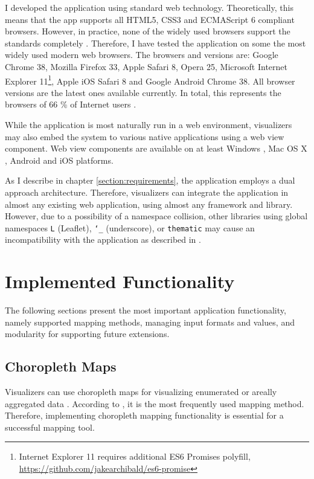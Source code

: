 I developed the application using standard web technology. Theoretically, this means that the app supports all HTML5, CSS3 and ECMAScript 6 compliant browsers. However, in practice, none of the widely used browsers support the standards completely \citep{manian_html5_2011}. Therefore, I have tested the application on some the most widely used modern web browsers. The browsers and versions are: Google Chrome 38, Mozilla Firefox 33, Apple Safari 8, Opera 25, Microsoft Internet Explorer 11\footnote{Internet Explorer 11 requires additional ES6 Promises polyfill, \url{https://github.com/jakearchibald/es6-promise}}, Apple iOS Safari 8 and Google Android Chrome 38. All browser versions are the latest ones available currently. In total, this represents the browsers of 66 \% of Internet users \citep{statcounter_globalstats_2014}.

While the application is most naturally run in a web environment, visualizers may also embed the system to various native applications using a web view component. Web view components are available on at least Windows \citep{small_ten_2012}, Mac OS X \citep{hunter_why_2014}, Android \citep{google_building_2014} and iOS \citep{apple_uiwebview_2014} platforms.

As I describe in chapter \ref{section:requirements}, the application employs a dual approach architecture. Therefore, visualizers can integrate the application in almost any existing web application, using almost any framework and library. However, due to a possibility of a namespace collision, other libraries using global namespaces \texttt{L} (Leaflet), \texttt{\char`_} (underscore), or \texttt{thematic} may cause an incompatibility with the application as described in \citet{osmani_essential_2011}.

\section{Implemented Functionality}

The following sections present the most important application functionality, namely supported mapping methods, managing input formats and values, and modularity for supporting future extensions.

\subsection{Choropleth Maps}

Visualizers can use choropleth maps for visualizing enumerated or areally aggregated data \citep[chap.~6]{dent_cartography:_2008}. According to \citet[chap.~14]{slocum_thematic_2014}, it is the most frequently used mapping method. Therefore, implementing choropleth mapping functionality is essential for a successful mapping tool.

